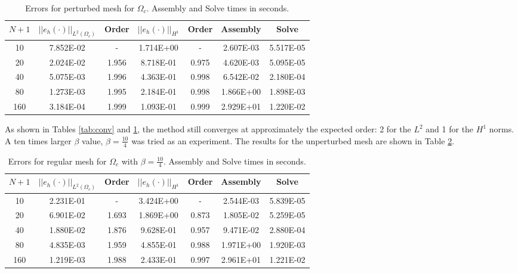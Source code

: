 \documentclass[a4paper, 12pt]{article}
\begin{document}
\begin{table}[!ht]
\caption{Errors for perturbed mesh for $\Omega_c$. Assembly and Solve times in seconds.}
\vspace{0.1in}
\centering
\begin{tabular}{|c|c|c|c|c|c|c|}
\hline
 $N+1$&  $||e_h(\cdot)||_{L^2(\Omega_c)}$ & Order & $||e_h(\cdot)||_{H^1}$ & Order & Assembly & Solve \\
 \hline
     10   & 7.852E-02 & -     & 1.714E+00 &  -     & 2.607E-03 & 5.517E-05 \\
     20   & 2.024E-02 & 1.956 & 8.718E-01 &  0.975 & 4.620E-03 & 5.095E-05 \\
     40   & 5.075E-03 & 1.996 & 4.363E-01 &  0.998 & 6.542E-02 & 2.180E-04 \\
     80   & 1.273E-03 & 1.995 & 2.184E-01 &  0.998 & 1.866E+00 & 1.898E-03 \\
     160  & 3.184E-04 & 1.999 & 1.093E-01 &  0.999 & 2.929E+01 & 1.220E-02 \\
\hline
\end{tabular}
\label{tab:pert}
\end{table}


As shown in Tables \ref{tab:conv} and \ref{tab:pert}, the method 
still converges at approximately the expected order: 
2 for the $L^2$ and 
1 for the $H^1$ norms.
A ten times larger $\beta$ value, $\beta=\frac{10}{4}$ was tried as an 
experiment.
The results for the unperturbed mesh are shown in Table \ref{t:b2}.


\begin{table}[!ht]
\caption{Errors for regular mesh for $\Omega_c$ with $\beta = \frac{10}{4}$. Assembly and Solve times in seconds.}
\vspace{0.1in}
\centering
\begin{tabular}{|c|c|c|c|c|c|c|}
\hline
 $N+1$&  $||e_h(\cdot)||_{L^2(\Omega_c)}$ & Order & $||e_h(\cdot)||_{H^1}$ & Order & Assembly & Solve \\
 \hline
     10   & 2.231E-01 &  -      & 3.424E+00 &  -     & 2.544E-03 & 5.839E-05 \\
     20   & 6.901E-02 &  1.693  & 1.869E+00 &  0.873 & 1.805E-02 & 5.259E-05 \\
     40   & 1.880E-02 &  1.876  & 9.628E-01 &  0.957 & 9.471E-02 & 2.880E-04 \\
     80   & 4.835E-03 &  1.959  & 4.855E-01 &  0.988 & 1.971E+00 & 1.920E-03 \\
     160  & 1.219E-03 &  1.988  & 2.433E-01 &  0.997 & 2.961E+01 & 1.221E-02 \\
\hline
\end{tabular}
\label{t:b2}
\end{table}
\end{document}
